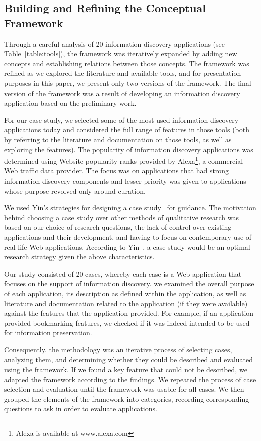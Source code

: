 \documentclass{sigchi}
\begin{document}
{\subsection{Building and Refining the Conceptual Framework}
\label{subsection:building}
Through a careful analysis of 20 information discovery applications (see Table~\ref{table:tools}), the framework was iteratively expanded by adding new concepts and establishing relations between those concepts.  The framework was refined as we explored the literature and available tools, and for presentation purposes in this paper, we present only two versions of the framework. The final version of the framework was a result of developing an information discovery application based on the preliminary work.    

For our case study, we selected some of the most used information discovery applications today and considered the full range of features in those tools (both by referring to the literature and documentation on those tools, as well as exploring the features). The popularity of information discovery applications was determined using Website popularity ranks provided by Alexa\footnote[1]{Alexa is available at www.alexa.com}, a commercial Web traffic data provider. The focus was on applications that had strong information discovery components and lesser priority was given to applications whose purpose revolved only around curation.

We used Yin's strategies for designing a case study~\cite{yin2014case} for guidance. The motivation behind choosing a case study over other methods of qualitative research was based on our choice of research questions, the lack of control over existing applications and their development, and having to focus on contemporary use of real-life Web applications. According to Yin~\cite{yin2014case}, a case study would be an optimal research strategy given the above characteristics.

Our study consisted of 20 cases, whereby each case is a Web application that focuses on the support of information discovery. we examined the overall purpose of each application, its description as defined within the application, as well as literature and documentation related to the application (if they were available) against the features that the application provided. For example, if an application provided bookmarking features, we checked if it was indeed intended to be used for information preservation. 

Consequently, the methodology was an iterative process of selecting cases, analyzing them, and determining whether they could be described and evaluated using the framework. If we found a key feature that could not be described, we adapted the framework according to the findings. We repeated the process of case selection and evaluation until the framework was usable for all cases. We then grouped the elements of the framework into categories, recording corresponding questions to ask in order to evaluate applications. 

}
\end{document}
